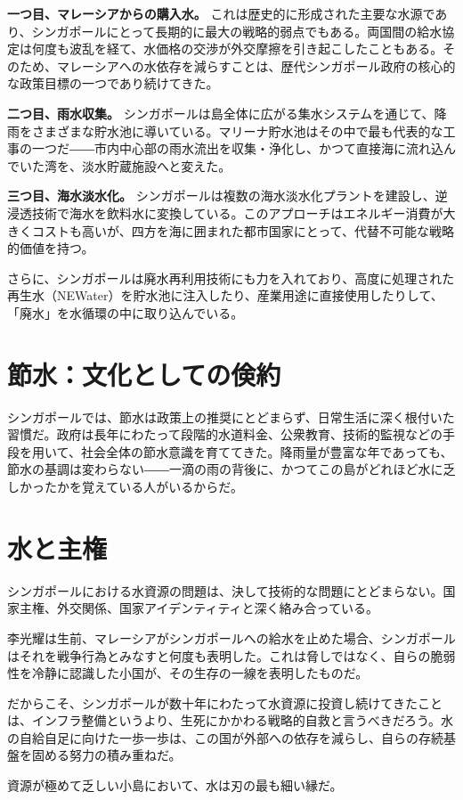 \textbf{一つ目、マレーシアからの購入水。} これは歴史的に形成された主要な水源であり、シンガポールにとって長期的に最大の戦略的弱点でもある。両国間の給水協定は何度も波乱を経て、水価格の交渉が外交摩擦を引き起こしたこともある。そのため、マレーシアへの水依存を減らすことは、歴代シンガポール政府の核心的な政策目標の一つであり続けてきた。

\textbf{二つ目、雨水収集。} シンガポールは島全体に広がる集水システムを通じて、降雨をさまざまな貯水池に導いている。マリーナ貯水池はその中で最も代表的な工事の一つだ――市内中心部の雨水流出を収集・浄化し、かつて直接海に流れ込んでいた湾を、淡水貯蔵施設へと変えた。

\textbf{三つ目、海水淡水化。} シンガポールは複数の海水淡水化プラントを建設し、逆浸透技術で海水を飲料水に変換している。このアプローチはエネルギー消費が大きくコストも高いが、四方を海に囲まれた都市国家にとって、代替不可能な戦略的価値を持つ。

さらに、シンガポールは廃水再利用技術にも力を入れており、高度に処理された再生水（NEWater）を貯水池に注入したり、産業用途に直接使用したりして、「廃水」を水循環の中に取り込んでいる。

\section{節水：文化としての倹約}

シンガポールでは、節水は政策上の推奨にとどまらず、日常生活に深く根付いた習慣だ。政府は長年にわたって段階的水道料金、公衆教育、技術的監視などの手段を用いて、社会全体の節水意識を育ててきた。降雨量が豊富な年であっても、節水の基調は変わらない――一滴の雨の背後に、かつてこの島がどれほど水に乏しかったかを覚えている人がいるからだ。

\section{水と主権}

シンガポールにおける水資源の問題は、決して技術的な問題にとどまらない。国家主権、外交関係、国家アイデンティティと深く絡み合っている。

李光耀は生前、マレーシアがシンガポールへの給水を止めた場合、シンガポールはそれを戦争行為とみなすと何度も表明した。これは脅しではなく、自らの脆弱性を冷静に認識した小国が、その生存の一線を表明したものだ。

だからこそ、シンガポールが数十年にわたって水資源に投資し続けてきたことは、インフラ整備というより、生死にかかわる戦略的自救と言うべきだろう。水の自給自足に向けた一歩一歩は、この国が外部への依存を減らし、自らの存続基盤を固める努力の積み重ねだ。

資源が極めて乏しい小島において、水は刃の最も細い縁だ。
